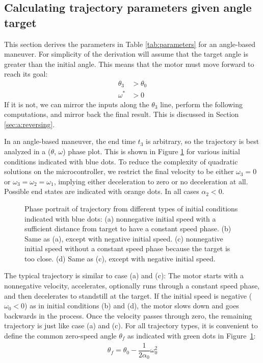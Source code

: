\documentclass[12pt, a4paper]
{article}
\providecommand{\w}{\omega}
\providecommand{\wt}{\w^*}
\renewcommand{\th}{\theta}
\renewcommand{\a}{\alpha}
\begin{document}
\subsection{Calculating trajectory parameters given angle target}
\label{sec:anglebasedref}
This section derives the parameters in Table \ref{tab:parameters} for an
angle-based maneuver. For simplicity of the derivation will assume that
the target angle  is greater than the initial angle. This
means that the motor must move forward to reach its goal:
%
\begin{align}
    \label{eq:a:forwardmaneuver}
    \th_3 &> \th_0\\
    \wt &> 0
\end{align}
%
If it is not, we can mirror the inputs along the $\th_3$ line, perform the
following computations, and mirror back the final result. This is discussed
in Section \ref{sec:a:reversing}.

In an angle-based maneuver, the end time $t_3$ is arbitrary, so the trajectory
is best analyzed in a ($\th$, $\w$) phase plot. This is shown in Figure
\ref{fig:positions} for various initial conditions indicated with blue dots.
To reduce the complexity of quadratic solutions on the microcontroller, we
restrict the final velocity to be either $\w_3=0$ or $\w_3=\w_2=\w_1$, implying
either deceleration to zero or no deceleration at all. Possible end states are
indicated with orange dots. In all cases $\a_2 < 0$.


\begin{figure}[H]
    \centering
    
    \caption{
        Phase portrait of trajectory from different types of initial conditions
        indicated with blue dots:
        (a) nonnegative initial speed with a
        sufficient distance from target to have a constant speed phase.
        (b) Same as (a), except with negative initial speed.
        (c) nonnegative initial speed without a constant speed phase because
        the target is too close.
        (d) Same as (c), except with negative initial speed.
        \label{fig:positions}}
\end{figure}


The typical trajectory is similar to case (a) and (c): The motor starts
with a nonnegative velocity, accelerates, optionally runs through a constant
speed phase, and then decelerates to standstill at the target.
If the initial speed is negative ($\w_0 < 0$) as in initial conditions (b)
and (d), the motor slows down and goes backwards in the process. Once the
velocity passes through zero, the remaining trajectory is just like case (a)
and (c). For all trajectory types, it is convenient to define the common
zero-speed angle $\th_f$ as indicated
with green dots in Figure~\ref{fig:positions}:
%
\begin{align}
    \th_f = \th_0 - \dfrac{1}{2 \a_0}\w_0^2
\end{align}
\end{document}
